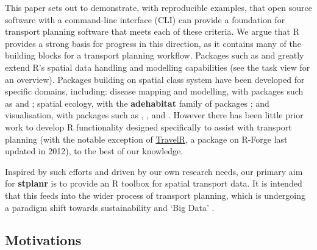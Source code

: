 This paper sets out to demonstrate, with reproducible examples, that open source software with a command-line interface (CLI) can provide a foundation for transport planning software that meets
each of these criteria.
We argue that R provides a strong basis for progress in this direction, as it contains many of the building blocks for a transport planning workflow.
Packages such as 
\citep{pebesma_classes_2005} and 
\citep{bivand_rgeos:_2016} greatly extend R's spatial data handling and
modelling capabilities \citep{bivand_applied_2013}
(see the  task view for an overview).
Packages building on
spatial class system have been developed for specific domains,
including: disease mapping and modelling, with packages such as  and  \citep{kim_spatialepi:_2016,brown_diseasemapping:_2016}; spatial ecology, with the \textbf{adehabitat} family of packages \citep{calenge_package_2006};
and visualisation, with packages such as , ,  and  \citep{RJ-2016-005}.
However there has been little prior work to develop R functionality designed
specifically to assist with transport planning (with the notable exception of
\href{http://r-forge.r-project.org/projects/travelr/}{TravelR}, a
package on R-Forge last updated in 2012), to the best of our knowledge.

Inspired by such efforts and driven by our own research needs, our
primary aim for \textbf{stplanr} is to provide an R toolbox for
spatial transport data.
It is intended that this feeds into the wider process of transport planning, which is undergoing a paradigm shift towards sustainability \citep{banister_sustainable_2008} and `Big Data' \citep{zheng_big_2016}.

\subsection{Motivations}\label{motivations}

